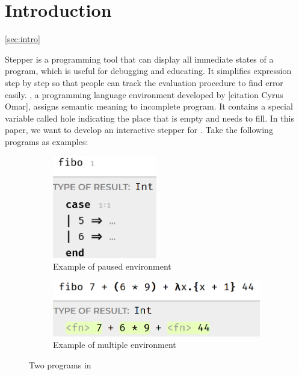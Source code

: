 \section{Introduction}
\ref{sec:intro}

Stepper is a programming tool that can display all immediate states of a program, which is useful for debugging and educating. It simplifies expression step by step so that people can track the evaluation procedure to find error easily. \Hazel, a programming language environment developed by [citation Cyrus Omar], assigns semantic meaning to incomplete program. It contains a special variable called hole indicating the place that is empty and needs to fill. In this paper, we want to develop an interactive stepper for \Hazel. Take the following programs as examples:

\begin{figure}[htbp]
  \centering
  \begin{subfigure}[b]{0.4\textwidth}
      \centering
      \includegraphics[width=0.5\textwidth]{img/pause_example.png}
      \caption{Example of paused environment}
      \label{fig:pause}
  \end{subfigure}
  \hfill
  \begin{subfigure}[b]{0.4\textwidth}
      \centering
      \includegraphics[width=\textwidth]{img/interactive.png}
      \caption{Example of multiple environment}
      \label{fig:multiple}
  \end{subfigure}
    \caption{Two programs in \Hazel}
    \label{fig:intro_example}
\end{figure}

